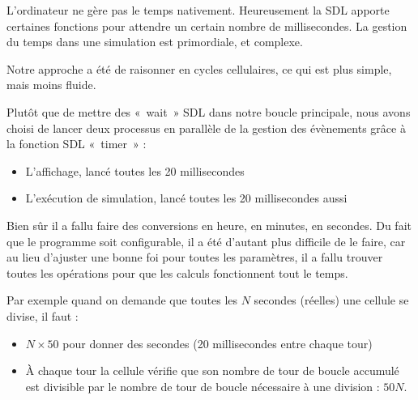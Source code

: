 L'ordinateur ne gère pas le temps nativement. Heureusement la SDL apporte certaines fonctions 
pour attendre un certain nombre de millisecondes. La gestion du temps 
dans une simulation est primordiale, et complexe.

Notre approche a été de raisonner en cycles cellulaires, ce qui est plus simple, mais moins fluide.

Plutôt que de mettre des «~wait~» SDL dans notre boucle principale, nous avons choisi de lancer 
deux processus en parallèle de la gestion des évènements grâce à la fonction SDL «~timer~» : 
  \begin{itemize}
    \item L'affichage, lancé toutes les 20 millisecondes
    \item L’exécution de simulation, lancé toutes les 20 millisecondes aussi
  \end{itemize}
  
Bien sûr il a fallu faire des conversions en heure, en minutes, en secondes. Du fait que le programme soit configurable, il a été d'autant plus difficile de le faire, car au lieu d'ajuster une bonne foi pour toutes les paramètres, il a fallu trouver toutes les opérations pour que les calculs fonctionnent tout le temps.

Par exemple quand on demande que toutes les $N$ secondes (réelles) une cellule se divise, il faut :
  \begin{itemize}
    \item $N \times 50$ pour donner des secondes (20 millisecondes entre chaque tour)
    \item À chaque tour la cellule vérifie que son nombre de tour de boucle accumulé est divisible par 
le nombre de tour de boucle nécessaire à une division : $50N$.
  \end{itemize}
